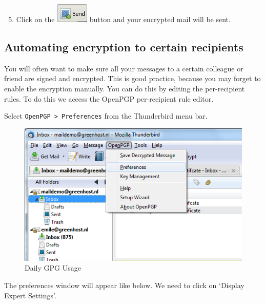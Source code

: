 \begin{enumerate}[1.]
\setcounter{enumi}{4}
\item
  Click on the \includegraphics{gpg_send.png} button and your encrypted
  mail will be sent.
\end{enumerate}
\subsection{Automating encryption to certain recipients}

You will often want to make sure all your messages to a certain
colleague or friend are signed and encrypted. This is good practice,
because you may forget to enable the encryption manually. You can do
this by editing the per-recipient rules. To do this we access the
OpenPGP per-recipient rule editor.

Select \verb!OpenPGP > Preferences! from the Thunderbird menu bar.

\begin{figure}[htbp]
\centering
\includegraphics{daily_gpg_23.png}
\caption{Daily GPG Usage}
\end{figure}

The preferences window will appear like below. We need to click on
`Display Expert Settings'.

